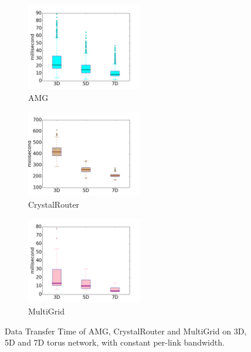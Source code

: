 \begin{figure}[t!]
    \centering
    \begin{subfigure}[t]{0.32\textwidth}
        \centering
        \includegraphics[height=1.5in]{figs/dimenstudy/amg_box}
        \caption{AMG}
        \label{fig:dimen-amg}
    \end{subfigure}%
    \hspace{1em}%
    \begin{subfigure}[t]{0.32\textwidth}
        \centering
        \includegraphics[height=1.5in]{figs/dimenstudy/cr_box}
        \caption{CrystalRouter}
        \label{fig:dimen-cr}
    \end{subfigure}%
    \begin{subfigure}[t]{0.32\textwidth}
        \centering
        \includegraphics[height=1.5in]{figs/dimenstudy/mg_box}
        \caption{MultiGrid}
        \label{fig:dimen-mg}
    \end{subfigure}%
   \caption{Data Transfer Time of AMG, CrystalRouter and MultiGrid on 3D, 5D and 7D torus network, with constant per-link bandwidth.}
   \label{fig:dimensionality-study}
\end{figure}

